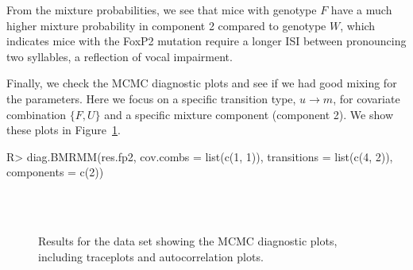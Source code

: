 {From the mixture probabilities, we see that mice with genotype $F$ have a much higher mixture probability in component 2 compared to genotype $W$, which indicates mice with the FoxP2 mutation require a longer ISI between pronouncing two syllables, a reflection of vocal impairment. }

Finally, we check the MCMC diagnostic plots and see if we had good mixing for the parameters. 
Here we focus on a specific transition type, $u\rightarrow m$, for covariate combination $\{F,U\}$ and a specific mixture component (component 2).
We show these plots in Figure~\ref{fig:diag}.

\begin{example}
R> diag.BMRMM(res.fp2, cov.combs = list(c(1, 1)), 
              transitions = list(c(4, 2)), components = c(2))
\end{example}



\begin{figure}[!ht]
\centering
{}\\
\\
\caption{Results for the  data set showing the MCMC diagnostic plots, including traceplots and autocorrelation plots. }
\label{fig:diag}
\end{figure}



